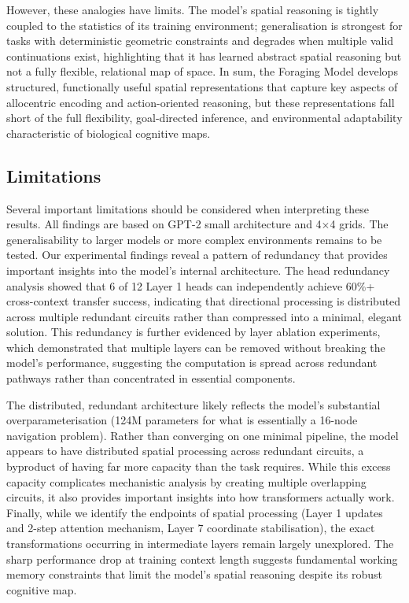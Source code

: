 However, these analogies have limits. The model’s spatial reasoning is tightly coupled to the statistics of its training environment; generalisation is strongest for tasks with deterministic geometric constraints and degrades when multiple valid continuations exist, highlighting that it has learned abstract spatial reasoning but not a fully flexible, relational map of space. In sum, the Foraging Model develops structured, functionally useful spatial representations that capture key aspects of allocentric encoding and action-oriented reasoning, but these representations fall short of the full flexibility, goal-directed inference, and environmental adaptability characteristic of biological cognitive maps.

\subsection{Limitations}

Several important limitations should be considered when interpreting these results. All findings are based on GPT-2 small architecture and 4$\times$4 grids. The generalisability to larger models or more complex environments remains to be tested. Our experimental findings reveal a pattern of redundancy that provides important insights into the model's internal architecture. The head redundancy analysis showed that 6 of 12 Layer 1 heads can independently achieve 60\%+ cross-context transfer success, indicating that directional processing is distributed across multiple redundant circuits rather than compressed into a minimal, elegant solution. This redundancy is further evidenced by layer ablation experiments, which demonstrated that multiple layers can be removed without breaking the model's performance, suggesting the computation is spread across redundant pathways rather than concentrated in essential components. 

The distributed, redundant architecture likely reflects the model's substantial overparameterisation (124M parameters for what is essentially a 16-node navigation problem). Rather than converging on one minimal pipeline, the model appears to have distributed spatial processing across redundant circuits, a byproduct of having far more capacity than the task requires. While this excess capacity complicates mechanistic analysis by creating multiple overlapping circuits, it also provides important insights into how transformers actually work. Finally, while we identify the endpoints of spatial processing (Layer 1 updates and 2-step attention mechanism, Layer 7 coordinate stabilisation), the exact transformations occurring in intermediate layers remain largely unexplored. The sharp performance drop at training context length suggests fundamental working memory constraints that limit the model's spatial reasoning despite its robust cognitive map.

